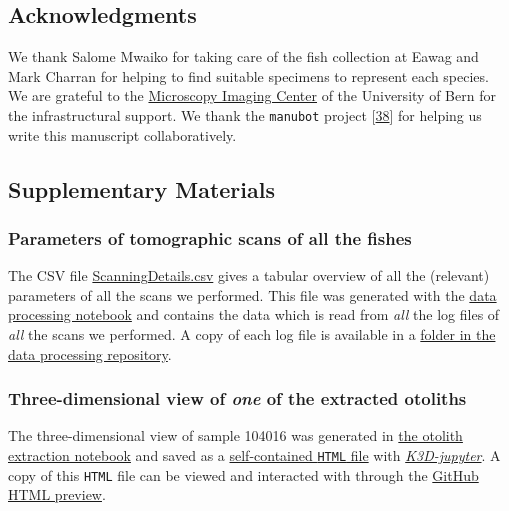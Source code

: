 \hypertarget{acknowledgments}{%
\subsection{Acknowledgments}\label{acknowledgments}}

We thank Salome Mwaiko for taking care of the fish collection at Eawag and Mark Charran for helping to find suitable specimens to represent each species.
We are grateful to the \href{https//www.mic.unibe.ch/}{Microscopy Imaging Center} of the University of Bern for the infrastructural support.
We thank the \texttt{manubot} project {[}\protect\hyperlink{ref-YuJbg3zO}{38}{]} for helping us write this manuscript collaboratively.

\hypertarget{supplementary-materials}{%
\subsection{Supplementary Materials}\label{supplementary-materials}}

\hypertarget{parameters-of-tomographic-scans-of-all-the-fishes}{%
\subsubsection{Parameters of tomographic scans of all the fishes}\label{parameters-of-tomographic-scans-of-all-the-fishes}}

The CSV file \href{https://github.com/habi/EAWAG-manuscript/blob/main/content/data/ScanningDetails.csv}{ScanningDetails.csv} gives a tabular overview of all the (relevant) parameters of all the scans we performed.
This file was generated with the \href{https://github.com/habi/EAWAG/blob/master/DataWrangling.ipynb}{data processing notebook} and contains the data which is read from \emph{all} the log files of \emph{all} the scans we performed.
A copy of each log file is available in a \href{https://github.com/habi/EAWAG/tree/master/logfiles}{folder in the data processing repository}.

\hypertarget{three-dimensional-view-of-one-of-the-extracted-otoliths}{%
\subsubsection{\texorpdfstring{Three-dimensional view of \emph{one} of the extracted otoliths}{Three-dimensional view of one of the extracted otoliths}}\label{three-dimensional-view-of-one-of-the-extracted-otoliths}}

The three-dimensional view of sample 104016 was generated in \href{https://github.com/habi/EAWAG/blob/master/ExtractOtoliths.ipynb}{the otolith extraction notebook} and saved as a \href{https://github.com/habi/EAWAG-manuscript/blob/main/content/data/104016.head.rec.otolith.region.3D.html}{self-contained \texttt{HTML} file} with \href{https://github.com/K3D-tools/K3D-jupyter}{\emph{K3D-jupyter}}.
A copy of this \texttt{HTML} file can be viewed and interacted with through the \href{https://htmlpreview.github.io/?https://github.com/habi/EAWAG-manuscript/blob/main/content/data/104016_Enterochromis_I_cinctus_St_E.head.rec.Otolith.Region.3D.html}{GitHub HTML preview}.

